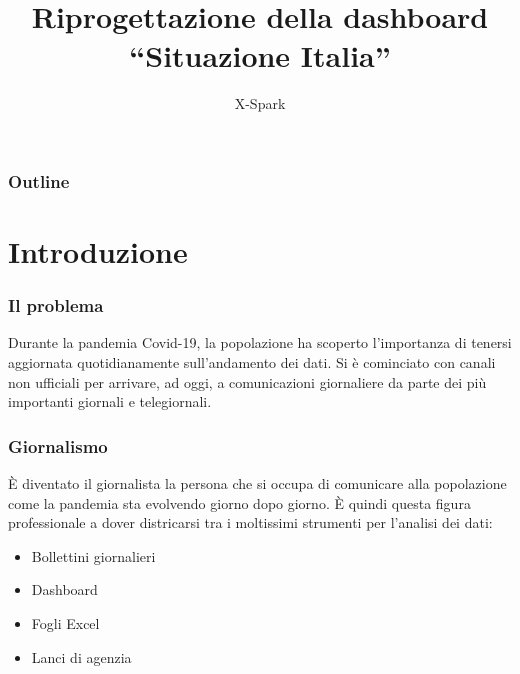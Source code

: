 \documentclass[handout]{beamer}
\title{Riprogettazione della dashboard\\``Situazione Italia''}
\author{X-Spark}
\institute[UniBo]{Alma Mater Studiorum Università di Bologna}
\date{}
\begin{document}
	\begin{frame}[plain]
	  \titlepage
	\end{frame}
	\begin{frame}
  		\frametitle{Outline}
		\tableofcontents
	\end{frame}
	
	\section{Introduzione}

		\begin{frame}
			\frametitle{Il problema}
			Durante la pandemia Covid-19, la popolazione ha scoperto l'importanza di tenersi aggiornata quotidianamente sull'andamento dei dati.\newline \newline
			Si è cominciato con canali non ufficiali per arrivare, ad oggi, a comunicazioni giornaliere da parte dei più importanti giornali e telegiornali.
		\end{frame}

		\begin{frame}
			\frametitle{Giornalismo}
			\`E diventato il giornalista la persona che si occupa di comunicare alla popolazione come la pandemia sta evolvendo giorno dopo giorno.\newline \newline
			\`E quindi questa figura professionale  a dover districarsi tra i moltissimi strumenti per l'analisi dei dati:
			\begin{itemize}[<+->]
				\item Bollettini giornalieri\\
				\item Dashboard\\
				\item Fogli Excel\\
				\item Lanci di agenzia\\
			\end{itemize}
		\end{frame}
\end{document}
